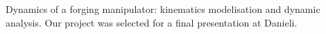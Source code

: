 \documentclass[11pt,a4paper,sans]{moderncv} %
\begin{document}



 {Dynamics of a forging manipulator: kinematics modelisation and dynamic analysis. Our project was selected for a final presentation at Danieli.}






\end{document}

